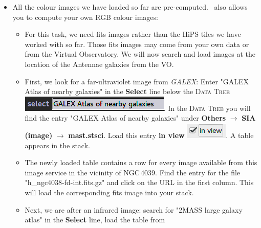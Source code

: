 \documentclass [a4paper, 12pt]{article}
\begin{document}
\begin{itemize}
    \item All the colour images we have loaded so far are pre-computed.
\aladin\ also allows you to compute your own RGB colour images:
     \begin{itemize}
         \item For this task, we need fits images rather than the HiPS tiles we have
         worked with so far. Those fits images may come from your own data or
         from the Virtual Observatory. We will now search and load images at
         the location of the Antennae galaxies from the VO.
         \item First, we look for a far-ultraviolet image from
         \textit{GALEX}: Enter "GALEX Atlas of nearby galaxies" in the
         \textbf{Select} line below the
         \textsc{Data Tree} \includegraphics[width=0.17
         \textwidth]{../images/aladin_select_GALEX.png}. In the \textsc{Data
         Tree} you will find the entry "GALEX Atlas of nearby galaxies" under
         \textbf{Others} $\rightarrow$ \textbf{SIA (image)} $\rightarrow$
         \textbf{mast.stsci}. Load this entry \textbf{in view}
         \includegraphics[width=0.07
         \textwidth]{../images/aladin_load_inview.png}. A table appears in the
         stack.
         \item The newly loaded table contains a row for every image available
         from this image service in the vicinity of NGC\,4039. Find the entry
         for the file "h\_ngc4038-fd-int.fits.gz" and click on the URL in the
         first column. This will load the corresponding fits image into your
         stack.
         \item Next, we are after an infrared image: search for "2MASS large
         galaxy atlas" in the \textbf{Select} line, load the table from

\end{itemize}
\end{itemize}
\end{document}
